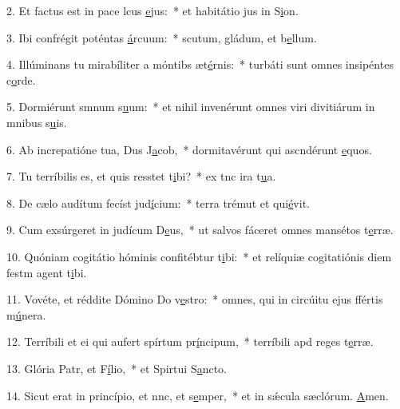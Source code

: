 2. Et factus est in pace lcus \uline{e}jus:~* et habitátio jus in S\uline{i}on.\par 
3. Ibi confrégit poténtas \uline{á}rcuum:~* scutum, gládum, et b\uline{e}llum.\par 
4. Illúminans tu mirabíliter a móntibs æt\uline{é}rnis:~* turbáti sunt omnes insipéntes c\uline{o}rde.\par 
5. Dormiérunt smnum s\uline{u}um:~* et nihil invenérunt omnes viri divitiárum in mnibus s\uline{u}is.\par 
6. Ab increpatióne tua, Dus J\uline{a}cob,~* dormitavérunt qui ascndérunt \uline{e}quos.\par 
7. Tu terríbilis es, et quis resstet t\uline{i}bi?~* ex tnc ira t\uline{u}a.\par 
8. De cælo audítum fecíst jud\uline{í}cium:~* terra trémut et qui\uline{é}vit.\par 
9. Cum exsúrgeret in judícum D\uline{e}us,~* ut salvos fáceret omnes mansétos t\uline{e}rræ.\par 
10. Quóniam cogitátio hóminis confitébtur t\uline{i}bi:~* et relíquiæ cogitatiónis diem festm agent t\uline{i}bi.\par 
11. Vovéte, et réddite Dómino Do v\uline{e}stro:~* omnes, qui in circúitu ejus ffértis m\uline{ú}nera.\par 
12. Terríbili et ei qui aufert spírtum pr\uline{í}ncipum,~* terríbili apd reges t\uline{e}rræ.\par 
13. Glória Patr, et F\uline{í}lio,~* et Spirtui S\uline{a}ncto.\par 
14. Sicut erat in princípio, et nnc, et s\uline{e}mper,~* et in sǽcula sæclórum. \uline{A}men.\par 
